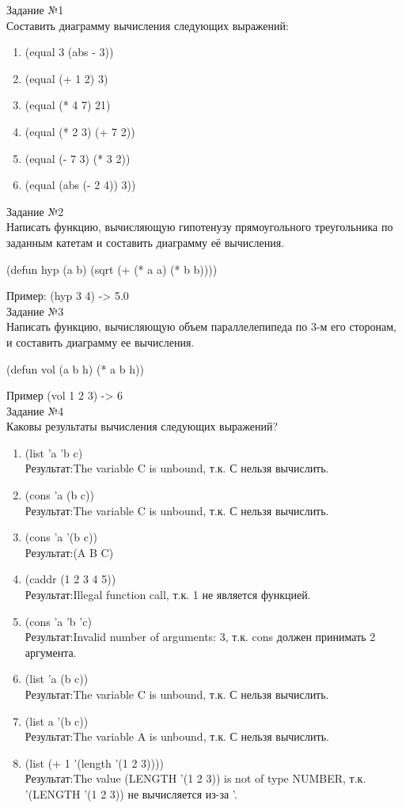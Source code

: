 {\LARGE Задание №1}\\

Составить диаграмму вычисления следующих выражений:
\begin{enumerate}
\item (equal 3 (abs - 3))
\item (equal (+ 1 2) 3)
\item (equal (* 4 7) 21)
\item (equal (* 2 3) (+ 7 2))
\item (equal (- 7 3) (* 3 2))
\item (equal (abs (- 2 4)) 3))\\
\end{enumerate}

{\LARGE Задание №2}\\

Написать функцию, вычисляющую гипотенузу прямоугольного треугольника по заданным катетам и составить диаграмму её вычисления.

(defun hyp (a b) (sqrt (+ (* a a) (* b b))))

Пример: (hyp 3 4) -> 5.0\\

{\LARGE Задание №3}\\

Написать функцию, вычисляющую объем параллелепипеда по 3-м его сторонам, и составить диаграмму ее вычисления.

(defun vol (a b h) (* a b h))

Пример (vol 1 2 3) -> 6\\

{\LARGE Задание №4}\\
Каковы результаты вычисления следующих выражений?

\begin{enumerate}
\item (list 'a 'b c)\\
Результат:The variable C is unbound, т.к. С нельзя вычислить.
\item (cons 'a (b c))\\
Результат:The variable C is unbound, т.к. С нельзя вычислить.
\item (cons 'a '(b c))\\
Результат:(A B C)
\item (caddr (1 2 3 4 5))\\
Результат:Illegal function call, т.к. 1 не является функцией.
\item (cons 'a 'b 'c)\\
Результат:Invalid number of arguments: 3, т.к. cons должен принимать 2 аргумента.
\item (list 'a (b c))\\
Результат:The variable C is unbound, т.к. С нельзя вычислить.
\item (list a '(b c))\\
Результат:The variable A is unbound, т.к. С нельзя вычислить.
\item (list (+ 1 '(length '(1 2 3))))\\
Результат:The value (LENGTH '(1 2 3)) is not of type NUMBER, т.к. '(LENGTH '(1 2 3)) не вычисляется из-за '.
\end{enumerate}

